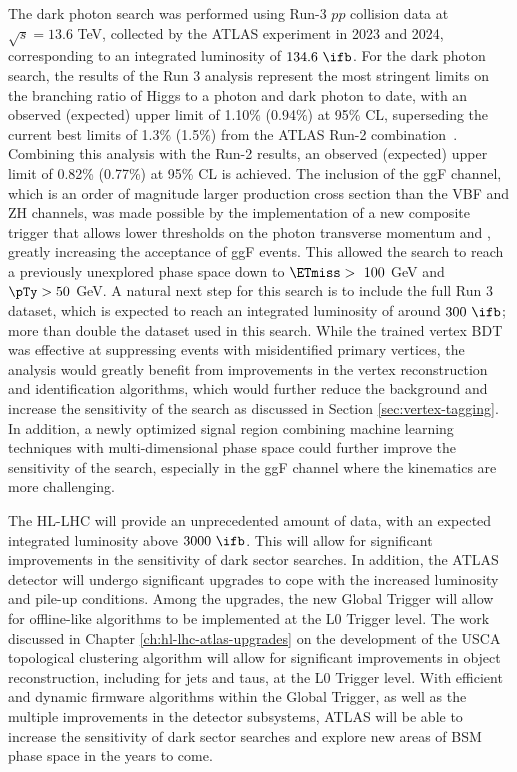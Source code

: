 The dark photon search was performed using Run-3 $pp$ collision data at $\sqrt{s}=13.6$ TeV, collected by the ATLAS experiment in 2023 and 2024, corresponding to an integrated luminosity of $134.6~\ifb$. 
For the dark photon search, the results of the Run 3 analysis represent the most stringent limits on the branching ratio of Higgs to a photon and dark photon to date, with an observed (expected) upper limit of 1.10\% (0.94\%) at 95\% CL, superseding the current best limits of 1.3\% (1.5\%) from the ATLAS Run-2 combination~\cite{ATLAS:2024cju}. Combining this analysis with the Run-2 results, an observed (expected) upper limit of 0.82\% (0.77\%) at 95\% CL is achieved.
The inclusion of the ggF channel, which is an order of magnitude larger production cross section than the VBF and ZH channels, was made possible by the implementation of a new composite trigger that allows lower thresholds on the photon transverse momentum and \ETmiss, greatly increasing the acceptance of ggF events.
This allowed the search to reach a previously unexplored phase space down to $\ETmiss > ~100$ GeV and $\pTy > 50$ GeV. 
A natural next step for this search is to include the full Run 3 dataset, which is expected to reach an integrated luminosity of around $300~\ifb$; more than double the dataset used in this search. 
While the trained vertex BDT was effective at suppressing events with misidentified primary vertices, the analysis would greatly benefit from improvements in the vertex reconstruction and identification algorithms, which would further reduce the background and increase the sensitivity of the search as discussed in Section \ref{sec:vertex-tagging}.
In addition, a newly optimized signal region combining machine learning techniques with multi-dimensional phase space could further improve the sensitivity of the search, especially in the ggF channel where the kinematics are more challenging.\par %
The HL-LHC will provide an unprecedented amount of data, with an expected integrated luminosity above $3000~\ifb$.
This will allow for significant improvements in the sensitivity of dark sector searches.
In addition, the ATLAS detector will undergo significant upgrades to cope with the increased luminosity and pile-up conditions.
Among the upgrades, the new Global Trigger will allow for offline-like algorithms to be implemented at the L0 Trigger level.
The work discussed in Chapter \ref{ch:hl-lhc-atlas-upgrades} on the development of the USCA topological clustering algorithm will allow for significant improvements in object reconstruction, including for jets and taus, at the L0 Trigger level.
With efficient and dynamic firmware algorithms within the Global Trigger, as well as the multiple improvements in the detector subsystems, ATLAS will be able to increase the sensitivity of dark sector searches and explore new areas of BSM phase space in the years to come.
